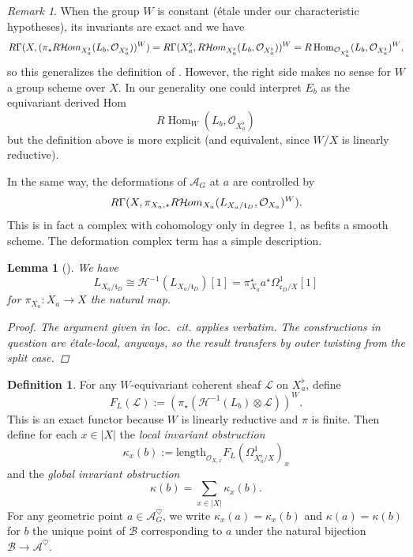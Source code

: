 \documentclass[openany]{amsbook}
\newtheorem{lemma}[theorem]{Lemma}
\theoremstyle{definition}
\newtheorem{definition}[theorem]{Definition}
\theoremstyle{remark}
\newtheorem{remark}[theorem]{Remark}
\numberwithin{equation}{section}
\renewcommand{\O}{\mathcal{O}}
\newcommand{\cH}{\mathcal{H}}
\newcommand{\cA}{\mathcal{A}}
\newcommand{\cL}{\mathcal{L}}
\newcommand{\cB}{\mathcal{B}}
\renewcommand{\-}{\operatorname{-}}
\newcommand{\Hom}{\operatorname{Hom}}
\newcommand{\sHom}{\mathcal{H}\kern -.5pt om}
\newcommand{\RsHom}{R\sHom}
\newcommand{\ft}{\mathfrak{t}}
\newcommand{\fc}{\mathfrak{c}}
\begin{document}
\begin{remark}
When the group $W$ is constant (\'etale under our characteristic hypotheses), its invariants are exact and we have
$$
    R\Gamma(X, (\pi_\star \RsHom_{X^\flat_a}(L_b, \O_{X_a^\flat}))^W) = R\Gamma(X_a^\flat, \RsHom_{X^\flat_a}(L_b, \O_{X_a^\flat}))^W = R\Hom_{\O_{X_a^\flat}}(L_b, \O_{X_a^\flat})^W,
$$
so this generalizes the definition of \cite{CLII}. However, the right side makes no sense for $W$ a group scheme over $X$. In our generality one could interpret $E_b$ as the equivariant derived Hom
$$
    R \Hom_W(L_b, \O_{X_a^\flat})
$$
but the definition above is more explicit (and equivalent, since $W/X$ is linearly reductive).
\end{remark}

In the same way, the deformations of $\cA_G$ at $a$ are controlled by
$$
    R\Gamma(X, \pi_{X_a,\star} \RsHom_{X_a}(L_{X_a/\ft_D}, \O_{X_a})^W).
$$
This is in fact a complex with cohomology only in degree 1, as befits a smooth scheme. The deformation complex term has a simple description.

\begin{lemma}[{\cite[Lemme 9.6.1]{CLII}}]\label{lem.H-1.LX_a}
    We have
    $$
        L_{X_a/\ft_D} \cong \cH^{-1}(L_{X_a/\ft_D})[1] =\pi^\star_{X_a} a^\star \Omega^1_{\fc_D/X}[1]
    $$
    for $\pi_{X_a} : X_a \to X$ the natural map.
    \begin{proof}
        The argument given in \textit{loc.\ cit.} applies verbatim. The constructions in question are \'etale-local, anyways, so the result transfers by outer twisting from the split case.
    \end{proof}
\end{lemma}


\begin{definition}\label{def.kappa.inv}
    For any $W$-equivariant coherent sheaf $\cL$ on $X_a^\flat$, define
    $$
        F_L(\cL) := (\pi_\star(\cH^{-1}(L_b) \otimes \cL))^W.
    $$
    This is an exact functor because $W$ is linearly reductive and $\pi$ is finite. Then define for each $x \in |X|$ the \emph{local invariant obstruction}
    $$
        \kappa_x(b) := \mathrm{length}_{\O_{X,x}} F_L(\Omega^1_{X_a^\flat/X})_x
    $$
    and the \emph{global invariant obstruction}
    $$
        \kappa(b) = \sum_{x \in |X|} \kappa_x(b).
    $$
    For any geometric point $a \in \cA_G^{\heartsuit}$, we write $\kappa_x(a) = \kappa_x(b)$ and $\kappa(a) = \kappa(b)$ for $b$ the unique point of $\cB$ corresponding to $a$ under the natural bijection $\cB \to \cA^{\heartsuit}$.
\end{definition}
\end{document}
